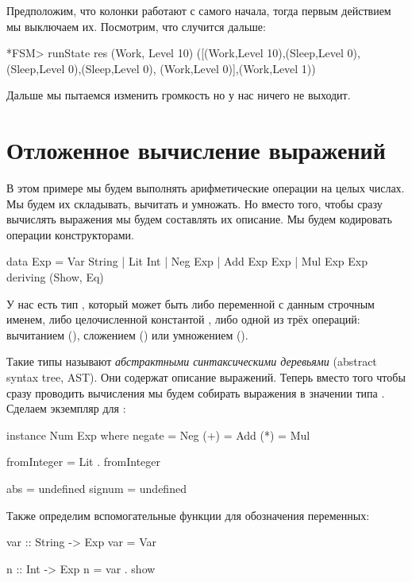 Предположим, что колонки работают с самого начала, тогда первым
действием мы выключаем их. Посмотрим, что случится дальше:


\begin{code}
*FSM> runState res (Work, Level 10)
([(Work,Level 10),(Sleep,Level 0),(Sleep,Level 0),(Sleep,Level 0),
 (Work,Level 0)],(Work,Level 1))
\end{code}

Дальше мы пытаемся изменить громкость но у нас ничего не выходит.

\section{Отложенное вычисление выражений}

В этом примере мы будем выполнять арифметические операции на целых
числах. Мы будем их складывать, вычитать и умножать. Но вместо того,
чтобы сразу вычислять выражения мы будем составлять их описание. Мы
будем кодировать операции конструкторами.


\begin{code}
data Exp    = Var String
            | Lit Int
            | Neg Exp
            | Add Exp Exp
            | Mul Exp Exp
            deriving (Show, Eq)
\end{code}

У нас есть тип , который может быть либо переменной  с
данным строчным именем, либо целочисленной константой , либо
одной из трёх операций: вычитанием (), сложением () или
умножением ().

Такие типы называют \emph{абстрактными синтаксическими деревьями}
(abstract syntax tree, AST). Они содержат описание выражений. Теперь
вместо того чтобы сразу проводить вычисления мы будем собирать выражения
в значении типа . Сделаем экземпляр для :


\begin{code}
instance Num Exp where
    negate  = Neg
    (+)     = Add
    (*)     = Mul

    fromInteger = Lit . fromInteger

    abs     = undefined
    signum  = undefined
\end{code}

Также определим вспомогательные функции для обозначения переменных:


\begin{code}
var :: String -> Exp
var = Var

n :: Int -> Exp
n = var . show
\end{code}

